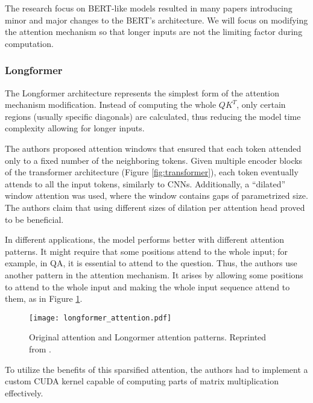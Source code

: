 The research focus on BERT-like models resulted in many papers introducing minor and major changes to the BERT's architecture.
We will focus on modifying the attention mechanism so that longer inputs are not the limiting factor during computation.

\subsubsection{Longformer}

The Longformer architecture \citep{longformer} represents the simplest form of the attention mechanism modification.
Instead of computing the whole $QK^T$, only certain regions (usually specific diagonals) are calculated, thus reducing the model time complexity allowing for longer inputs.

The authors proposed attention windows that ensured that each token attended only to a fixed number of the neighboring tokens. 
Given multiple encoder blocks of the transformer architecture (Figure \ref{fig:transformer}), each token eventually attends to all the input tokens, similarly to CNNs.  
Additionally, a ``dilated'' window attention was used, where the window contains gaps of parametrized size. 
The authors claim that using different sizes of dilation per attention head proved to be beneficial.

In different applications, the model performs better with different attention patterns.
It might require that some positions attend to the whole input; for example, in QA, it is essential to attend to the question.
Thus, the authors use another pattern in the attention mechanism.
It arises by allowing some positions to attend to the whole input and making the whole input sequence attend to them, as in Figure \ref{fig:longformer_attention}.  %

\begin{figure}[!htb]
        \centering
        \texttt{[image: longformer\_attention.pdf]}
        \caption[Longformer Attention Patterns]{Original attention and Longormer attention patterns. Reprinted from \citep{longformer}.}
        \label{fig:longformer_attention}
\end{figure}

To utilize the benefits of this sparsified attention, the authors had to implement a custom CUDA kernel capable of computing parts of matrix multiplication effectively.

